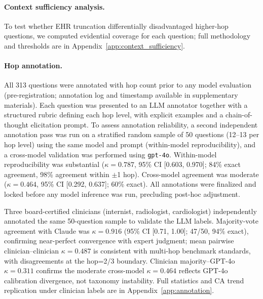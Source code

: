 \documentclass{article}
\begin{document}
\paragraph{Context sufficiency analysis.}
To test whether EHR truncation differentially disadvantaged higher-hop questions, we computed evidential coverage for each question; full methodology and thresholds are in Appendix~\ref{app:context_sufficiency}.

\paragraph{Hop annotation.}
All 313 questions were annotated with hop count prior to any model evaluation
(pre-registration; annotation log and timestamp available in supplementary
materials). Each question was presented to an LLM annotator together with a
structured rubric defining each hop level, with explicit examples and a
chain-of-thought elicitation prompt. To assess annotation reliability, a second independent annotation pass was
run on a stratified random sample of 50 questions (12--13 per hop level)
using the same model and prompt (within-model reproducibility), and a
cross-model validation was performed using \texttt{gpt-4o}.
Within-model reproducibility was substantial ($\kappa = 0.787$, 95\% CI
[0.603, 0.970]; 84\% exact agreement, 98\% agreement within $\pm$1 hop).
Cross-model agreement was moderate ($\kappa = 0.464$, 95\% CI [0.292,
0.637]; 60\% exact). All annotations were finalized and locked before any
model inference was run, precluding post-hoc adjustment.

Three board-certified clinicians (internist, radiologist, cardiologist)
independently annotated the same 50-question sample to validate the LLM labels.
Majority-vote agreement with Claude was $\kappa = 0.916$ (95\% CI [0.71, 1.00];
47/50, 94\% exact), confirming near-perfect convergence with expert judgment;
mean pairwise clinician--clinician $\kappa = 0.487$ is consistent with
multi-hop benchmark standards, with disagreements at the hop=2/3 boundary.
Clinician majority--GPT-4o $\kappa = 0.311$ confirms the moderate cross-model
$\kappa = 0.464$ reflects GPT-4o calibration divergence, not taxonomy
instability. Full statistics and CA trend replication under clinician labels
are in Appendix~\ref{app:annotation}.
\end{document}
